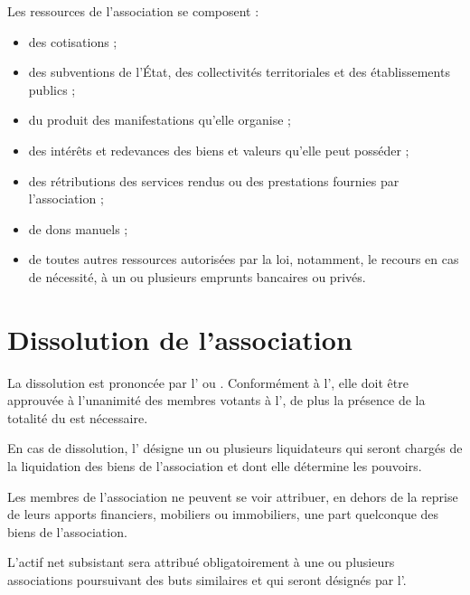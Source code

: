 \label{sec:ressources}
Les ressources de l'association se composent :
\begin{itemize}
\item des cotisations ;
  
\item des subventions de l'État, des collectivités territoriales et
des établissements publics ;

\item du produit des manifestations qu'elle organise ;

\item des intérêts et redevances des biens et valeurs qu'elle peut
posséder ;

\item des rétributions des services rendus ou des prestations fournies
par l'association ;

\item de dons manuels ;

\item de toutes autres ressources autorisées par la loi, notamment, le
recours en cas de nécessité, à un ou plusieurs emprunts bancaires ou
privés.
\end{itemize}


\section{Dissolution de l'association}

\label{sec:dissolution}
La dissolution est prononcée par l'\AGO{} ou \AGE{}. Conformément à l', elle doit être approuvée à l'unanimité des membres votants à l'\AG{}, de plus la présence de la totalité du \bureau{} est nécessaire.

En cas de dissolution, l'\AG{} désigne un ou plusieurs
liquidateurs qui seront chargés de la liquidation des biens de
l'association et dont elle détermine les pouvoirs.

Les membres de l'association ne peuvent se voir attribuer, en dehors
de la reprise de leurs apports financiers, mobiliers ou immobiliers,
une part quelconque des biens de l'association.

L'actif net subsistant sera attribué obligatoirement à une ou
plusieurs associations poursuivant des buts similaires et qui seront
désignés par l'\AG{}.



